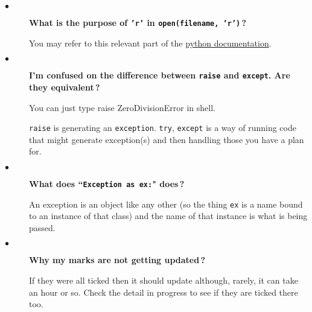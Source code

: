\documentclass{article}
\newcommand{\inlinecode}[1]{\texttt{#1}}
\newcommand{\link}[2]{\textcolor{blue}{\href{#2}{#1}}}
\newcommand{\question}[1]{\item[$\bullet$] 
	\begin{minipage}[t]{\textwidth}
		\bfseries#1
	\end{minipage}
	\hfil
}
\newenvironment{answer}{}{}
\newenvironment{faq}{\begin{description}}{\end{description}}
\begin{document}
\begin{faq}
		\question{What is the purpose of \inlinecode{'r'} in \inlinecode{open(filename, 'r')}\,?}
		\begin{answer}
			You may refer to this relevant part of the \link{python documentation}{https://docs.python.org/3/tutorial/inputoutput.html\#reading-and-writing-files}.
		\end{answer}
		
		\question{I'm confused on the difference between \inlinecode{raise} and \inlinecode{except}. Are they equivalent\,?}
		
		\begin{answer}
			You can just type raise ZeroDivisionError in shell.
			
			\inlinecode{raise} is generating an \inlinecode{exception}. \inlinecode{try}, \inlinecode{except} is a way of running code that might generate exception(s) and then handling those you have a plan for.
		\end{answer}
		
		\question{What does ``\inlinecode{Exception as ex:}" does\,?}
		\begin{answer}
			An exception is an object like any other (so the thing \inlinecode{ex} is a name bound to an instance of that class) and the name of that instance is what is being passed.
		\end{answer}
		
		\question{Why my marks are not getting updated\,?}
		\begin{answer}
			If they were all ticked then it should update although, rarely, it can take an hour or so. Check the detail in progress to see if they are ticked there too.
		\end{answer}
	\end{faq}
	
\end{document}
